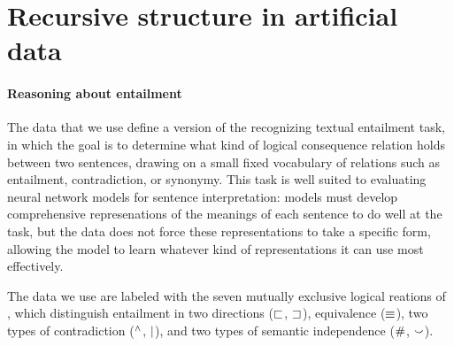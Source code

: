 \section{Recursive structure in artificial data}\label{sec:recursion}
\paragraph{Reasoning about entailment} 
The data that we use define a version of the recognizing textual entailment task, in which the goal is to determine what kind of logical consequence relation holds between two sentences, drawing on a small fixed vocabulary of relations such as entailment, contradiction, or synonymy. This task is well suited to evaluating neural network models for sentence interpretation: models must develop comprehensive represenations of the meanings of each sentence to do well at the task, but the data does not force these representations to take a specific form, allowing the model to learn whatever kind of representations it can use most effectively.

The data we use are labeled with the seven mutually exclusive logical reations of , which distinguish entailment in two directions ($\sqsubset$, $\sqsupset$), equivalence ($\equiv$), two types of contradiction ($\mathbin{^{\wedge}}$, $\mathbin{|}$), and two types of semantic independence ($\mathbin{\#}$, $\mathbin{\smallsmile}$).


